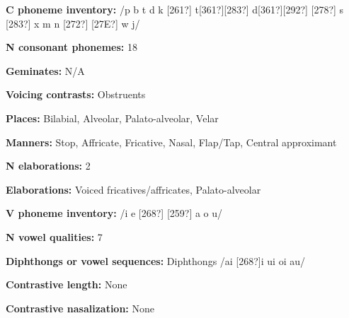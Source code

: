\begin{styleBody}
\textbf{C phoneme inventory:} /p b t d k [261?] t[361?][283?] d[361?][292?] [278?] s [283?] x m n [272?] [27E?] w j/
\end{styleBody}

\begin{styleBody}
\textbf{N consonant phonemes:} 18
\end{styleBody}

\begin{styleBody}
\textbf{Geminates:} N/A
\end{styleBody}

\begin{styleBody}
\textbf{Voicing contrasts: }Obstruents
\end{styleBody}

\begin{styleBody}
\textbf{Places: }Bilabial, Alveolar, Palato-alveolar, Velar
\end{styleBody}

\begin{styleBody}
\textbf{Manners:} Stop, Affricate, Fricative, Nasal, Flap/Tap, Central approximant
\end{styleBody}

\begin{styleBody}
\textbf{N elaborations:} 2
\end{styleBody}

\begin{styleBody}
\textbf{Elaborations:} Voiced fricatives/affricates, Palato-alveolar
\end{styleBody}

\begin{styleBody}
\textbf{V phoneme inventory:} /i e [268?] [259?] a o u/
\end{styleBody}

\begin{styleBody}
\textbf{N vowel qualities:} 7
\end{styleBody}

\begin{styleBody}
\textbf{Diphthongs or vowel sequences:} Diphthongs /ai [268?]i ui oi au/
\end{styleBody}

\begin{styleBody}
\textbf{Contrastive length:} None
\end{styleBody}

\begin{styleBody}
\textbf{Contrastive nasalization:} None
\end{styleBody}

